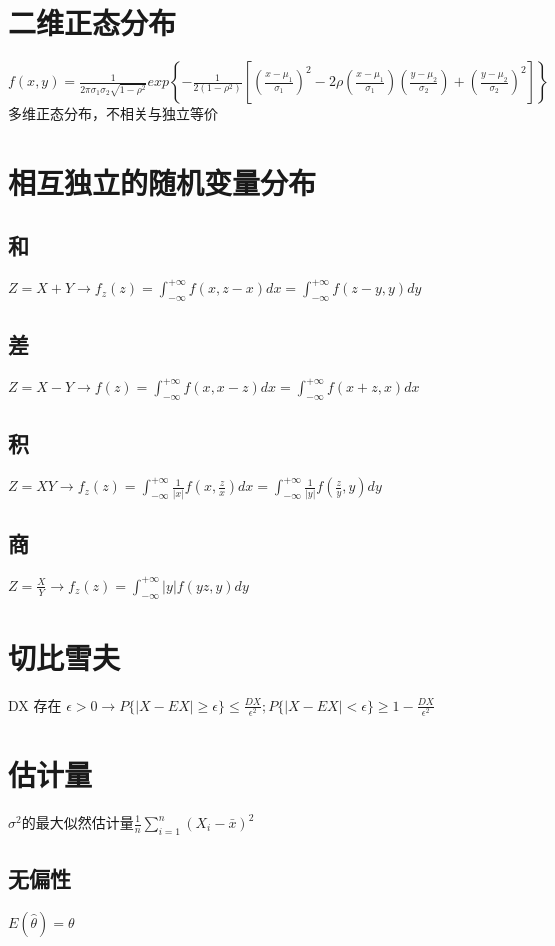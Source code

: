 \documentclass[UTF8]{ctexart}
\begin{document}
\section{二维正态分布}
$f(x,y)=\frac{1}{2 \pi \sigma_1 \sigma_2 \sqrt {1- \rho ^2 }}exp
\left\{
 - \frac{1}{2(1- \rho^2)}
\left[
 {(\frac{x- \mu_1}{\sigma_1})}^2
 -2 \rho
 (\frac{x- \mu_1}{\sigma_1})
 (\frac{y-\mu_2}{\sigma_2})
 +{(\frac{y-\mu_2}{\sigma_2})}^2
 \right]
 \right\}
$
多维正态分布，不相关与独立等价

\section{相互独立的随机变量分布}
\subsection{和}
$Z=X+Y \longrightarrow f_z(z)=\int_{-\infty}^{+\infty}f(x,z-x)dx=\int_{-\infty}^{+\infty}f(z-y,y)dy$ \\
\subsection{差}
$Z=X-Y \longrightarrow f(z)=\int_{-\infty}^{+\infty}f(x,x-z)dx=\int_{-\infty}^{+\infty}f(x+z,x)dx$
\subsection{积}
$Z=XY \longrightarrow f_z(z) = \int_{-\infty}^{+\infty}
\frac{1}{|x|}
f(x,\frac{z}{x})
dx=
\int_{-\infty}^{+\infty}
\frac{1}{|y|}
f(\frac{z}{y},{y})
dy
$
\subsection{商}
$Z=\frac{X}{Y} \longrightarrow
f_z(z)=
\int_{-\infty}^{+\infty}
|y|
f(yz,y)
dy
$
\section{切比雪夫}
DX 存在
$\epsilon>0
\rightarrow P\{|X-EX|\geq \epsilon\}\leq\frac{DX}{\epsilon^2} ;
P\{|X-EX|< \epsilon\}\geq1-\frac{DX}{\epsilon^2}$

\section{估计量}
$\sigma^2$的最大似然估计量$\frac{1}{n}
\sum_{i=1}^n
{(X_i - \bar{x})}^2$
\subsection{无偏性} 
$E(\hat{\theta})=\theta$ 
\end{document}
